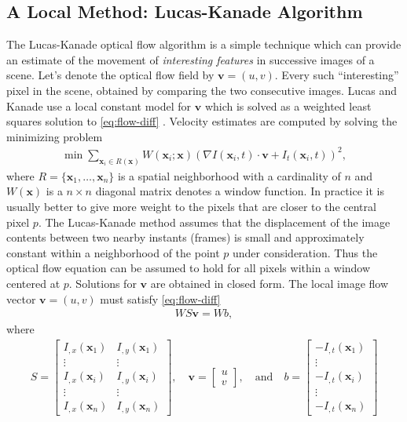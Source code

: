 \documentclass[letterpaper,12pt]{article}
\begin{document}
\subsection{A Local Method: Lucas-Kanade Algorithm}
\label{sec:Lucas-Kanade}
The Lucas-Kanade optical flow algorithm is a simple technique which can provide an estimate of the movement of \emph{interesting features} in successive
images of a scene. Let's denote the optical flow field by $\mathbf{v} = (u, v)$. Every such ``interesting'' pixel in the scene, obtained by comparing the two consecutive images. Lucas and Kanade use a local constant model for $\mathbf{v} $ which
is solved as a weighted least squares solution to \eqref{eq:flow-diff} \citep{Lucas:Kanade:1981}. Velocity estimates are
computed by solving the minimizing problem
\begin{align}
\min \sum_{\mathbf{x}_i \in R(\mathbf{x})}W(\mathbf{x}_i;\mathbf{x})(\nabla I(\mathbf{x}_i,t) \cdot \mathbf{v} + I_t(\mathbf{x}_i,t))^2,
\label{eq:lucas:canade:optim}
\end{align}
where $R = \{ \mathbf{x}_1,\dots,\mathbf{x}_n \}$ is a spatial neighborhood with a cardinality of $n$ and $W(\mathbf{x})$ is a $n \times n$ diagonal matrix denotes a window function.  In practice it is usually better to give more weight to the pixels that are closer to the central pixel $p$. The Lucas-Kanade method assumes that the displacement of the image contents between two nearby instants (frames) is small and approximately constant within a neighborhood of the point $p$ under consideration. Thus the optical flow equation can be assumed to hold for all pixels within a window centered at $p$. Solutions for $\mathbf{v}$ are obtained in closed form. The local image flow vector $\mathbf{v} = (u,v)$ must satisfy \eqref{eq:flow-diff}
\begin{align}
W S \mathbf{v} = W b,
\label{eq:lucal-kanade-matrix}
\end{align}
where
\begin{align}
S = \begin{bmatrix}
I_{,x}(\mathbf{x}_1) & I_{,y}(\mathbf{x}_1)\\
\vdots & \vdots\\
I_{,x}(\mathbf{x}_i) & I_{,y}(\mathbf{x}_i) \\
\vdots & \vdots\\
I_{,x}(\mathbf{x}_n) & I_{,y}(\mathbf{x}_n) 
\end{bmatrix},  \quad \mathbf{v} = \begin{bmatrix}
u \\
v
\end{bmatrix}, \quad \textrm{and} \quad b = \begin{bmatrix}
-I_{,t}(\mathbf{x}_1) \\
\vdots \\
-I_{,t}(\mathbf{x}_i) \\
\vdots \\
-I_{,t}(\mathbf{x}_n) 
\end{bmatrix}
\end{align} 
\end{document}
